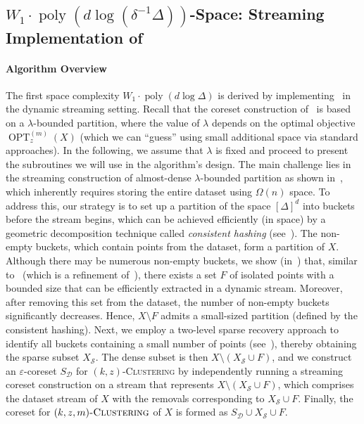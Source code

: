 \documentclass[letterpaper,11pt]{article}
\theoremstyle{plain}
\theoremstyle{definition}
\theoremstyle{remark}
\DeclareMathOperator{\poly}{poly}
\DeclareMathOperator{\OPT}{OPT}
\renewcommand{\epsilon}{\varepsilon}
\newcommand{\calD}{\mathcal{D}}
\newcommand{\calS}{\mathcal{S}}
\newcommand{\ProblemName}[1]{\textsc{#1}}
\newcommand{\kzC}{\ProblemName{$(k,z)$-Clustering}\xspace}
\newcommand{\kzmC}{\ProblemName{$(k,z,m)$-Clustering}\xspace}
\begin{document}
      \subsection{$W_1\cdot\poly(d\log(\delta^{-1}\Delta))$-Space: Streaming Implementation of~}
\label{sec:streaming coreset}
\paragraph{Algorithm Overview}
The first space complexity $W_1\cdot \poly(d\log\Delta)$ is derived by implementing~ in the dynamic streaming setting.
Recall that the coreset construction of~ is based on a $\lambda$-bounded partition, where the value of $\lambda$ depends on the optimal objective $\OPT_z^{(m)}(X)$ (which we can ``guess'' using small additional space via standard approaches).
In the following, we assume that $\lambda$ is fixed and proceed to present the subroutines we will use in the algorithm's design.
The main challenge lies in the streaming construction of almost-dense $\lambda$-bounded partition as shown in~, which inherently requires storing the entire dataset using $\Omega(n)$ space. 
To address this, our strategy is to set up a partition of the space $[\Delta]^d$ into buckets before the stream begins,
which can be achieved efficiently (in space) by a geometric decomposition technique called \emph{consistent hashing} (see~). 
The non-empty buckets, which contain points from the dataset, form a partition of $X$.
Although there may be numerous non-empty buckets, we show (in~) that, similar to~ (which is a refinement of~), there exists a set $F$ of isolated points with a bounded size that can be efficiently extracted in a dynamic stream. Moreover, after removing this set from the dataset, the number of non-empty buckets significantly decreases. Hence, $X\setminus F$ admits a small-sized partition (defined by the consistent hashing).
Next, we employ a two-level sparse recovery approach to identify all buckets containing a small number of points (see~), thereby obtaining the sparse subset $X_{\calS}$. The dense subset is then $X\setminus (X_\calS \cup F)$, and we construct an $\epsilon$-coreset $S_{\calD}$ for \kzC by independently running a streaming coreset construction on a stream that represents $X\setminus (X_{\calS} \cup F)$, which comprises the dataset stream of $X$ with the removals corresponding to $X_{\calS} \cup F$. 
Finally, the coreset for $\kzmC$ of $X$ is formed as $S_{\calD} \cup X_{\calS} \cup F$.
\end{document}
